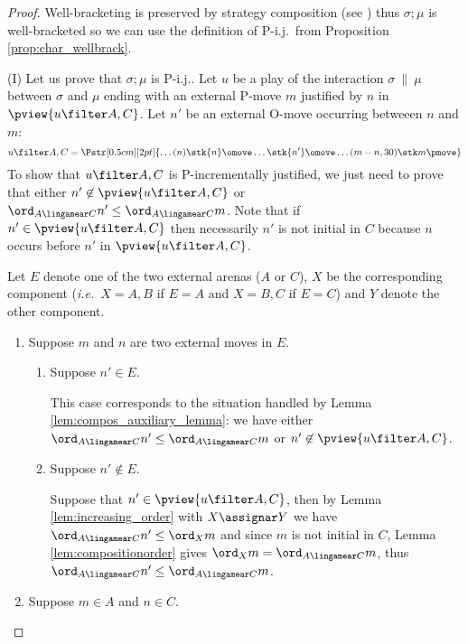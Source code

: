 \begin{proof}
Well-bracketing is preserved by strategy composition (see \cite[Proposition 2.5]{abramsky94full}) thus
$\sigma ; \mu$ is well-bracketed so we can use the definition of P-i.j.\ from Proposition \ref{prop:char_wellbrack}.

\noindent (I) Let us prove that $\sigma ; \mu$ is P-i.j..
Let $u$ be a play of the interaction $\sigma\ \|\ \mu$ between $\sigma$ and $\mu$
ending with an external P-move $m$
justified by $n$ in $\pview{u \filter A , C}$.
Let $n'$ be an external O-move occurring betweeen $n$ and $m$:
$$ u \filter A,C =
\Pstr[0.5cm][2pt]{ \ldots (n){\stk {n} \omove}  \ldots
 {\stk {n'} \omove}  \ldots  (m-n,30){\stk m \pmove}
}
$$
To show that $u \filter A,C$ is P-incrementally justified, we just
need to prove that either $n'\not\in \pview{u \filter A,C}$ or
$\ord_{A\lingamear C} n' \leq \ord_{A\lingamear C} m$. Note that if
$n'\in \pview{u \filter A,C}$ then necessarily $n'$ is not initial
in $C$ because $n$ occurs before $n'$ in $\pview{u \filter A,C}$.

Let $E$ denote one of the two external arenas ($A$ or $C$), $X$ be
the corresponding component ({\it i.e.}~$X=A,B$ if $E=A$ and $X=B,C$
if $E=C$) and $Y$ denote the other component.
    \begin{enumerate}[1)]
    \item Suppose $m$ and $n$ are two external moves in $E$.

        \begin{enumerate}[{1}.a)]
        \item Suppose $n' \in E$.

        This case corresponds to the situation handled by
        Lemma \ref{lem:compos_auxiliary_lemma}: we have
        either $\ord_{A\lingamear C} n' \leq
        \ord_{A\lingamear C} m$ or $n' \not\in \pview{u
        \filter A,C}$.

        \item Suppose $n' \not\in E$.

        Suppose that $n' \in \pview{u\filter A,C}$, then by
        Lemma \ref{lem:increasing_order} with $X\assignar Y$
        we have $ \ord_{A\lingamear C} n'  \leq \ord_X m$
        and since $m$ is not initial in $C$, Lemma
        \ref{lem:compositionorder} gives $\ord_X m =
        \ord_{A\lingamear C} m$, thus $\ord_{A\lingamear C}
        n' \leq \ord_{A\lingamear C} m$.
        \end{enumerate}

        \item \label{case:mA} Suppose $m \in A$ and $n \in C$.


\end{enumerate}
\end{proof}
